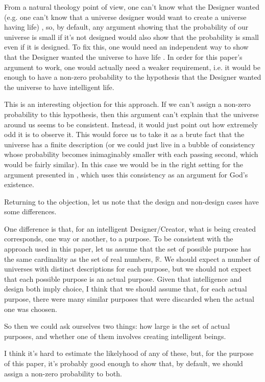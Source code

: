 \documentclass[a4paper
,draft
]{article}
\def\reale{\mathbb{R}}
\newcommand{\paper}[1]{paper}
\begin{document}
From a natural theology point of view, one can't
know what the Designer wanted
(e.g. one can't know that a universe designer would want to create
a universe having life) \parencites{Sober2009}{Narveson2003}, so, by default,
any argument showing that the probability of our universe is small
if it's not designed would also show that the probability is small
even if it is designed.
To fix this, one would need an independent way to show that the Designer
wanted the universe to have life \parencite{Sober2003}.
In order for this paper's argument to work, one would actually need a weaker
requirement, i.e. it would be enough to have a non-zero probability
to the hypothesis that the Designer wanted the universe to have intelligent
life.

This is an interesting objection for this approach.
If we can't assign a
non-zero probability to this hypothesis, then this argument can't explain
that the universe around us seems to be consistent.
Instead, it would just point out how extremely odd it is to observe it.
This would force us to take it as a brute fact that the universe has a
finite description (or we could just
live in a bubble of consistency whose probability becomes inimaginably
smaller with each passing second, which would be fairly similar).
In this case we would be in the right setting for the argument presented in
\cite{Swinburne2004}, which uses this consistency as an argument for God's
existence.

Returning to the objection, let us note that the design and non-design cases
have some differences.

One difference is that, for an intelligent Designer/Creator, what is being
created corresponds, one way or another, to a purpose.
To be consistent with
the approach used in this \paper{}, let us assume that the set of possible
purpose has the same cardinality as the set of real numbers, $\reale$.
We should expect a number of universes with
distinct descriptions for each purpose, but we should not expect that each
possible purpose is an actual purpose.
Given that intelligence and design
both imply choice, I think that we should assume that, for each actual purpose,
there were many similar purposes that were discarded when the actual one
was choosen.

So then we could ask ourselves two things: how large is the set of actual
purposes, and whether one of them involves creating intelligent beings.

I think it's hard to estimate the likelyhood of any of these, but, for the
purpose of this \paper{}, it's probably good enough to show that, by default,
we should assign a non-zero probability to both.
\end{document}
